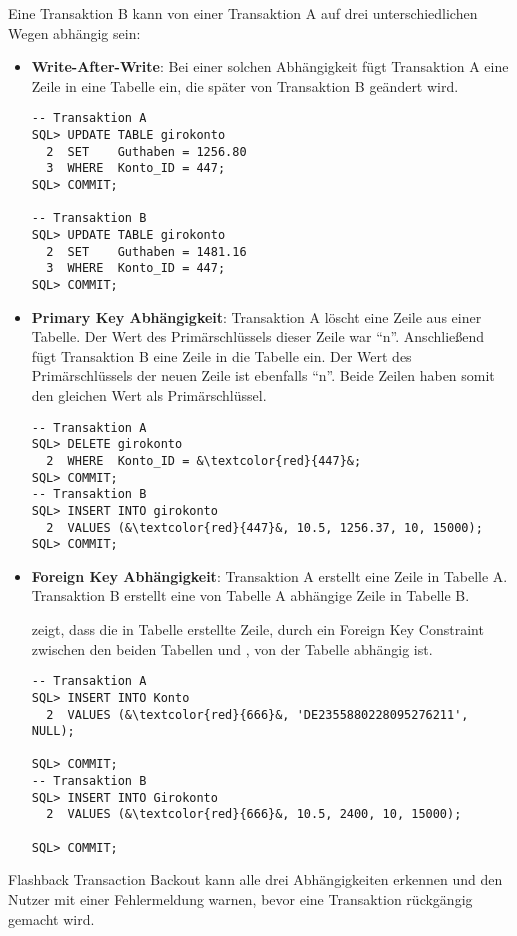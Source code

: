           Eine Transaktion B kann von einer Transaktion A auf drei
          unterschiedlichen Wegen abh\"angig sein:
\clearpage
          \begin{itemize}
            \item \textbf{Write-After-Write}: Bei einer solchen Abh\"angigkeit f\"ugt Transaktion A eine Zeile in eine Tabelle ein, die sp\"ater von Transaktion B ge\"andert wird.
              \begin{lstlisting}[caption={Eine Write-After-Write Abh\"angigkeit},label=admin1709,language=oracle_sql]
-- Transaktion A
SQL> UPDATE TABLE girokonto
  2  SET    Guthaben = 1256.80
  3  WHERE  Konto_ID = 447;
SQL> COMMIT;

-- Transaktion B
SQL> UPDATE TABLE girokonto
  2  SET    Guthaben = 1481.16
  3  WHERE  Konto_ID = 447;
SQL> COMMIT;
              \end{lstlisting}
            \item \textbf{Primary Key Abh\"angigkeit}: Transaktion A l\"oscht eine Zeile aus einer Tabelle. Der Wert des Prim\"arschl\"ussels dieser Zeile war \enquote{n}. Anschlie\ss{}end f\"ugt Transaktion B eine Zeile in die Tabelle ein. Der Wert des Prim\"arschl\"ussels der neuen Zeile ist ebenfalls \enquote{n}. Beide Zeilen haben somit den gleichen Wert als Prim\"arschl\"ussel.
              \begin{lstlisting}[caption={Eine Primary Key Abh\"angigkeit},label=admin1710,language=oracle_sql]
-- Transaktion A
SQL> DELETE girokonto
  2  WHERE  Konto_ID = &\textcolor{red}{447}&;
SQL> COMMIT;
-- Transaktion B
SQL> INSERT INTO girokonto
  2  VALUES (&\textcolor{red}{447}&, 10.5, 1256.37, 10, 15000);
SQL> COMMIT;
              \end{lstlisting}
            \item \textbf{Foreign Key Abh\"angigkeit}: Transaktion A erstellt eine Zeile in Tabelle A. Transaktion B erstellt eine von Tabelle A abh\"angige Zeile in Tabelle B.

             zeigt, dass die in Tabelle  erstellte Zeile,  durch ein Foreign Key Constraint zwischen den beiden Tabellen  und , von der Tabelle  abh\"angig ist.
            \begin{lstlisting}[caption={Eine Foreign Key Abh\"angigkeit},label=admin1711,language=oracle_sql]
-- Transaktion A
SQL> INSERT INTO Konto
  2  VALUES (&\textcolor{red}{666}&, 'DE2355880228095276211', NULL);

SQL> COMMIT;
-- Transaktion B
SQL> INSERT INTO Girokonto
  2  VALUES (&\textcolor{red}{666}&, 10.5, 2400, 10, 15000);

SQL> COMMIT;
              \end{lstlisting}
          \end{itemize}
          Flashback Transaction Backout kann alle drei Abh\"angigkeiten erkennen und den Nutzer mit einer Fehlermeldung warnen, bevor eine Transaktion r\"uckg\"angig gemacht wird.

